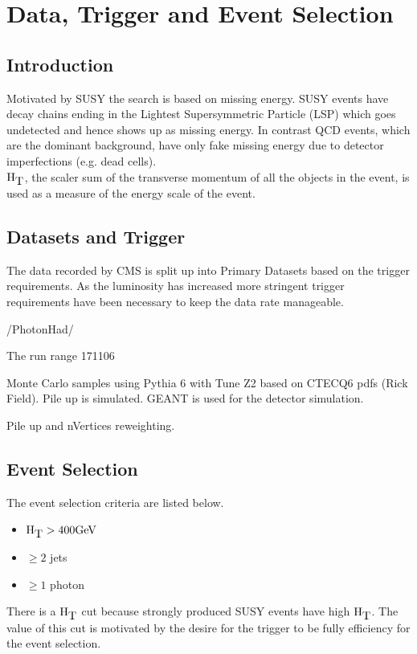 \chapter{Data, Trigger and Event Selection}

\section{Introduction}

Motivated by SUSY the search is based on missing energy. SUSY events have decay
chains ending in the Lightest Supersymmetric Particle (LSP) which goes
undetected and hence shows up as missing energy. In contrast QCD events, which
are the dominant background, have only fake missing energy due to detector
imperfections (e.g. dead cells). \\

$\mbox{H}_{\mbox{T}}$, the scaler sum of the transverse momentum of all the objects in the 
event, is used as a measure of the energy scale of the event.

\section{Datasets and Trigger}

The data recorded by CMS is split up into Primary Datasets based on the trigger
requirements. As the luminosity has increased more stringent trigger
requirements have been necessary to keep the data rate manageable.

/PhotonHad/

The run range 171106 

Monte Carlo samples using Pythia 6 with Tune Z2 based on CTECQ6 pdfs (Rick
Field). Pile up is simulated. GEANT is used for the detector simulation.

Pile up and nVertices reweighting.

\section{Event Selection}

The event selection criteria are listed below. 

\begin{itemize}
\item $\mbox{H}_{\mbox{T}} > 400 \mbox{GeV}$
\item $\geq 2$ jets
\item $\geq 1$ photon
\end{itemize}

There is a $\mbox{H}_{\mbox{T}}$ cut because strongly produced SUSY events have high $\mbox{H}_{\mbox{T}}$. The 
value of this cut is motivated by the desire for the trigger to be fully 
efficiency for the event selection. \\

